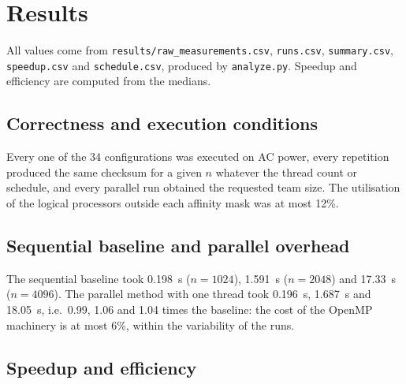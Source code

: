 \documentclass[12pt,a4paper]{report}
\begin{document}
\chapter{Results}
\label{chap:results}

All values come from \texttt{results/raw\_measurements.csv}, \texttt{runs.csv}, \texttt{summary.csv},
\texttt{speedup.csv} and \texttt{schedule.csv}, produced by \texttt{analyze.py}. Speedup and efficiency are computed
from the medians.

\section{Correctness and execution conditions}

Every one of the 34 configurations was executed on AC power, every repetition produced the same checksum for a given
$n$ whatever the thread count or schedule, and every parallel run obtained the requested team size. The utilisation of
the logical processors outside each affinity mask was at most 12\%.

\section{Sequential baseline and parallel overhead}

The sequential baseline took 0.198~s ($n = 1024$), 1.591~s ($n = 2048$) and 17.33~s ($n = 4096$). The parallel method
with one thread took 0.196~s, 1.687~s and 18.05~s, i.e.\ 0.99, 1.06 and 1.04 times the baseline: the cost of the OpenMP
machinery is at most 6\%, within the variability of the runs.

\section{Speedup and efficiency}
\end{document}
